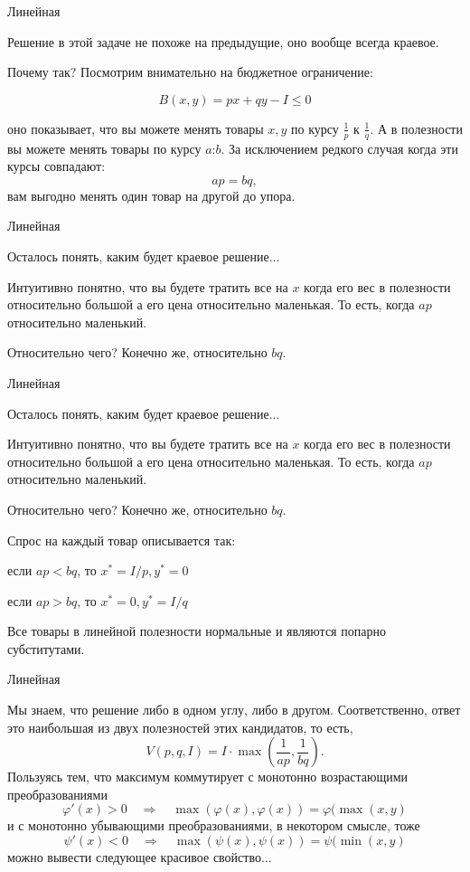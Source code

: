 \documentclass{beamer}
\begin{document}
\begin{frame}{Линейная}

Решение в этой задаче не похоже на предыдущие, оно вообще всегда краевое. 

Почему так? Посмотрим внимательно на бюджетное ограничение:

$$B(x,y) = px + qy - I \leqslant 0$$ 

оно показывает, что вы можете менять товары $x, y$ по курсу $\frac{1}{p}$ к $\frac{1}{q}$. А в полезности вы можете менять товары по курсу $a$:$b$. За исключением редкого случая когда эти курсы совпадают: 
$$ap = bq,$$ 
вам выгодно менять один товар на другой до упора.
\end{frame}

\begin{frame}{Линейная}

Осталось понять, каким будет краевое решение...

Интуитивно понятно, что вы будете тратить все на $x$ когда его вес в полезности относительно большой а его цена относительно маленькая. То есть, когда $ap$ относительно маленький. 

Относительно чего? Конечно же, относительно $bq$.

\end{frame}

\begin{frame}{Линейная}

Осталось понять, каким будет краевое решение...

Интуитивно понятно, что вы будете тратить все на $x$ когда его вес в полезности относительно большой а его цена относительно маленькая. То есть, когда $ap$ относительно маленький. 

Относительно чего? Конечно же, относительно $bq$.

Спрос на каждый товар описывается так: 

если $ap < bq$, то $x^{\ast} = I/p, y^{\ast} = 0$

если $ap > bq$, то $x^{\ast} = 0, y^{\ast} = I/q$

Все товары в линейной полезности нормальные и являются попарно субститутами.

\end{frame}

\begin{frame}{Линейная}

Мы знаем, что решение либо в одном углу, либо в другом. Соответственно, ответ это наибольшая из двух полезностей этих кандидатов, то есть,
$$V(p,q,I) = I \cdot \max(\frac{1}{ap}, \frac{1}{bq}).$$
Пользуясь тем, что максимум коммутирует с монотонно возрастающими преобразованиями
$$ \varphi'(x) >0 \quad \Rightarrow \quad \max(\varphi(x), \varphi(x)) = \varphi(\max(x, y)$$
и с монотонно убывающими преобразованиями, в некотором смысле, тоже
$$ \psi'(x) < 0 \quad \Rightarrow \quad \max(\psi(x), \psi(x)) = \psi(\min(x, y)$$
можно вывести следующее красивое свойство...

\end{frame}
\end{document}
